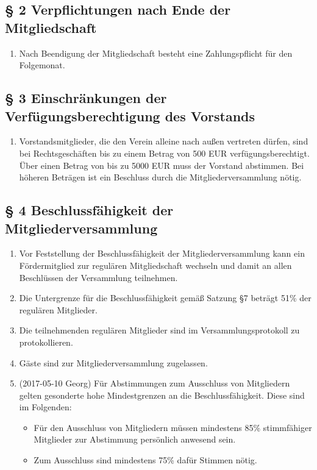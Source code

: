 \documentclass[10pt,a4paper]{article}
\begin{document}
%
%
\subsection*{§ 2 Verpflichtungen nach Ende der Mitgliedschaft}
\begin{enumerate}
\item Nach Beendigung der Mitgliedschaft besteht eine Zahlungspflicht für den Folgemonat.
\end{enumerate}
%
%
\subsection*{§ 3 Einschränkungen der Verfügungsberechtigung des Vorstands}
\begin{enumerate}
\item Vorstandsmitglieder, die den Verein alleine nach außen vertreten
    dürfen, sind bei Rechtsgeschäften bis zu einem Betrag von 500 EUR
    verfügungsberechtigt. Über einen Betrag von bis zu 5000 EUR muss der
    Vorstand abstimmen. Bei höheren Beträgen ist ein Beschluss durch die
    Mitgliederversammlung nötig.
\end{enumerate}
%
%
\subsection*{§ 4 Beschlussfähigkeit der Mitgliederversammlung}
\begin{enumerate}
\item Vor Feststellung der Beschlussfähigkeit der Mitgliederversammlung kann ein Fördermitglied zur regulären Mitgliedschaft wechseln und damit an allen Beschlüssen der Versammlung teilnehmen.
\item Die Untergrenze für die Beschlussfähigkeit gemäß Satzung §7 beträgt 51\% der regulären Mitglieder.
\item Die teilnehmenden regulären Mitglieder sind im Versammlungsprotokoll zu protokollieren.
\item Gäste sind zur Mitgliederversammlung zugelassen.
\item (2017-05-10 Georg) Für Abstimmungen zum Ausschluss von Mitgliedern gelten gesonderte hohe Mindestgrenzen an die Beschlussfähigkeit. Diese sind im Folgenden:
    \begin{itemize}
		\item Für den Ausschluss von Mitgliedern müssen mindestens 85\% stimmfähiger Mitglieder zur Abstimmung persönlich anwesend sein.
		\item Zum Ausschluss sind mindestens 75\% dafür Stimmen nötig.
	\end{itemize}
\end{enumerate}
%
%
\end{document}

